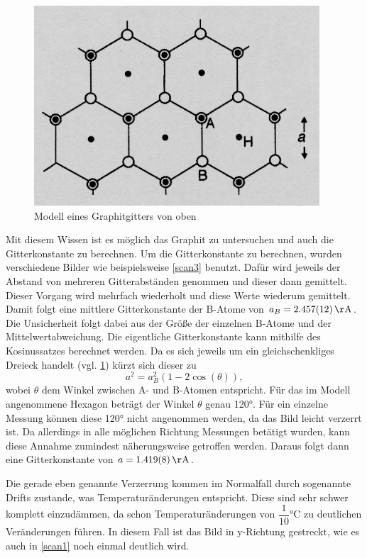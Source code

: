 \documentclass[
	a4paper,
	12pt,
	pagesize,
	ngerman
]{scrartcl}
\begin{document}
\begin{figure}[h!]
	\centering
	\includegraphics[scale=0.7]{graphitgitter2.png}
	\caption{Modell eines Graphitgitters von oben}
	\label{gra2}
\end{figure}

Mit diesem Wissen ist es möglich das Graphit zu untersuchen und auch die Gitterkonstante zu berechnen. Um die Gitterkonstante zu berechnen, wurden verschiedene Bilder wie beispielsweise \cref{scan3} benutzt. Dafür wird jeweils der Abstand von mehreren Gitterabständen genommen und dieser dann gemittelt. Dieser Vorgang wird mehrfach wiederholt und diese Werte wiederum gemittelt. Damit folgt eine mittlere Gitterkonstante der B-Atome von $a_{B} = \SI{2,457 \pm 0,012}{\AA}$. Die Unsicherheit folgt dabei aus der Größe der einzelnen B-Atome und der Mittelwertabweichung. Die eigentliche Gitterkonstante kann mithilfe des Kosinussatzes berechnet werden. Da es sich jeweils um ein gleichschenkliges Dreieck handelt (vgl. \cref{gra2}) kürzt sich dieser zu
\begin{equation}
a^{2} = a_{B}^2(1 - 2 \cos(\theta)),
\end{equation}
wobei $\theta$ dem Winkel zwischen A- und B-Atomen entspricht. Für das im Modell angenommene Hexagon beträgt der Winkel $\theta$ genau 120°. Für ein einzelne Messung können diese 120° nicht angenommen werden, da das Bild leicht verzerrt ist. Da allerdings in alle möglichen Richtung Messungen betätigt wurden, kann diese Annahme zumindest näherungsweise getroffen werden. Daraus folgt dann eine Gitterkonstante von $a = \SI{1,419 \pm 0,008} {\AA}$.

Die gerade eben genannte Verzerrung kommen im Normalfall durch sogenannte Drifts zustande, was Temperaturänderungen entspricht. Diese sind sehr schwer komplett einzudämmen, da schon Temperaturänderungen von $\dfrac{1}{10}$°C zu deutlichen Veränderungen führen. In diesem Fall ist das Bild in y-Richtung gestreckt, wie es auch in \cref{scan1} noch einmal deutlich wird.  
\end{document}
